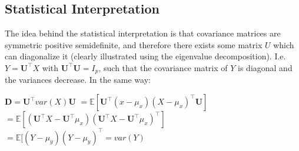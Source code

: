 \documentclass[english]{latex4ei/latex4ei_sheet}
\begin{document}
\begin{sectionbox}
\subsection{Statistical Interpretation}
The idea behind the statistical interpretation is that covariance matrices are symmetric positive semidefinite, and therefore there exists some matrix $U$ which can diagonalize it (clearly illustrated using the eigenvalue decomposition). I.e. $Y=\boldsymbol{U}^{\top}X$ with $\boldsymbol{U}^{\top}\boldsymbol{U}=I_p$, such that the covariance matrix of $Y$ is diagonal and the variances decrease. In the same way:
\begin{emphbox}
        $\boldsymbol{D}=\boldsymbol{U}^{\top}var(X)\boldsymbol{U} $
        $= \mathbb{E}[\boldsymbol{U}^{\top}(x-\mu_x)(X-\mu_x)^{\top}\boldsymbol{U}]$
        $=\mathbb{E}[(\boldsymbol{U}^{\top}X-\boldsymbol{U}^{\top}\mu_x)(\boldsymbol{U}^{\top}X-\boldsymbol{U}^{\top}\mu_x)^{\top}]$
        $=\mathbb{E}[(Y-\mu_y)(Y-\mu_y)^{\top}=var(Y)$
\end{emphbox}
\end{sectionbox}
\end{document}
